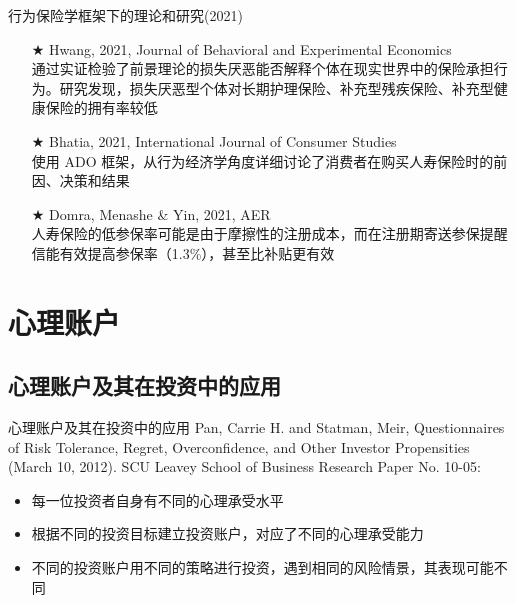 \documentclass[presentation]{beamer}
\begin{document}
\begin{frame}{行为保险学框架下的理论和研究(2021)}

	\begin{itemize}
		\item[$\bigstar$] Hwang, 2021, Journal of Behavioral and Experimental Economics\\通过实证检验了前景理论的损失厌恶能否解释个体在现实世界中的保险承担行为。研究发现，损失厌恶型个体对长期护理保险、补充型残疾保险、补充型健康保险的拥有率较低

		\item[$\bigstar$] Bhatia, 2021, International Journal of Consumer Studies\\使用 ADO 框架，从行为经济学角度详细讨论了消费者在购买人寿保险时的前因、决策和结果

		\item[$\bigstar$] Domra, Menashe \& Yin, 2021, AER\\人寿保险的低参保率可能是由于摩擦性的注册成本，而在注册期寄送参保提醒信能有效提高参保率（1.3\%），甚至比补贴更有效
	\end{itemize}
\end{frame}

\section{心理账户}
\label{cxy}
\subsection{心理账户及其在投资中的应用}
\begin{frame}{心理账户及其在投资中的应用}
	Pan, Carrie H. and Statman, Meir, Questionnaires of Risk Tolerance, Regret, Overconfidence, and Other Investor Propensities (March 10, 2012). SCU Leavey School of Business Research Paper No. 10-05:
	\begin{itemize}
		\item 每一位投资者自身有不同的心理承受水平
		\item 根据不同的投资目标建立投资账户，对应了不同的心理承受能力
		\item 不同的投资账户用不同的策略进行投资，遇到相同的风险情景，其表现可能不同
	\end{itemize}
\end{frame}
\end{document}
